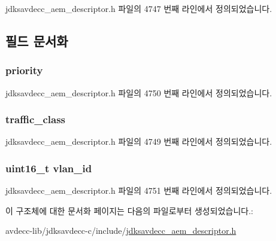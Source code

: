 jdksavdecc\+\_\+aem\+\_\+descriptor.\+h 파일의 4747 번째 라인에서 정의되었습니다.



\subsection{필드 문서화}
\subsubsection[{\texorpdfstring{priority}{priority}}]{ priority}\hypertarget{structjdksavdecc__msrp__mappings__format_a0ad043071ccc7a261d79a759dc9c6f0c}{}\label{structjdksavdecc__msrp__mappings__format_a0ad043071ccc7a261d79a759dc9c6f0c}


jdksavdecc\+\_\+aem\+\_\+descriptor.\+h 파일의 4750 번째 라인에서 정의되었습니다.

\subsubsection[{\texorpdfstring{traffic\+\_\+class}{traffic_class}}]{ traffic\+\_\+class}\hypertarget{structjdksavdecc__msrp__mappings__format_af92a6e10a8b9f2e12a072402f1be80c4}{}\label{structjdksavdecc__msrp__mappings__format_af92a6e10a8b9f2e12a072402f1be80c4}


jdksavdecc\+\_\+aem\+\_\+descriptor.\+h 파일의 4749 번째 라인에서 정의되었습니다.

\subsubsection[{\texorpdfstring{vlan\+\_\+id}{vlan_id}}]{\setlength{\rightskip}{0pt plus 5cm}uint16\+\_\+t vlan\+\_\+id}\hypertarget{structjdksavdecc__msrp__mappings__format_ad9a532da576820f8630b96c16692aa5a}{}\label{structjdksavdecc__msrp__mappings__format_ad9a532da576820f8630b96c16692aa5a}


jdksavdecc\+\_\+aem\+\_\+descriptor.\+h 파일의 4751 번째 라인에서 정의되었습니다.



이 구조체에 대한 문서화 페이지는 다음의 파일로부터 생성되었습니다.\+:\begin{DoxyCompactItemize}
\item 
avdecc-\/lib/jdksavdecc-\/c/include/\hyperlink{jdksavdecc__aem__descriptor_8h}{jdksavdecc\+\_\+aem\+\_\+descriptor.\+h}\end{DoxyCompactItemize}
